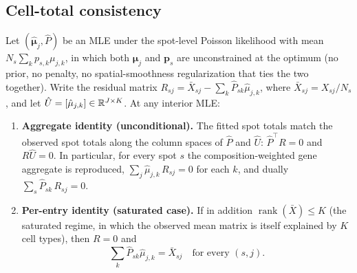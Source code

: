 \subsection{Cell-total consistency}

\begin{theorem}
\label{thm:cell-total-st}
Let $(\hat{\bm{\mu}}_j, \hat{P})$ be an MLE under the spot-level
Poisson likelihood with mean $N_s \sum_k p_{s,k}\mu_{j,k}$, in which
both $\bm{\mu}_j$ and $\bm{p}_s$ are unconstrained at the optimum
(no prior, no penalty, no spatial-smoothness regularization that
ties the two together). Write the residual matrix
$R_{sj} = \bar{X}_{sj} - \sum_k \hat P_{sk}\hat\mu_{j,k}$, where
$\bar{X}_{sj} = X_{sj}/N_s$, and let $\hat U = [\hat\mu_{j,k}] \in
\mathbb{R}^{J \times K}$. At any interior MLE:
\begin{enumerate}
\item[\emph{(a)}] \textbf{Aggregate identity (unconditional).} The
  fitted spot totals match the observed spot totals along the column
  spaces of $\hat P$ and $\hat U$: $\hat P^\top R = 0$ and
  $R\hat U = 0$. In particular, for every spot $s$ the
  composition-weighted gene aggregate is reproduced,
  $\sum_j \hat\mu_{j,k}\,R_{sj} = 0$ for each $k$, and dually
  $\sum_s \hat P_{sk}\,R_{sj} = 0$.
\item[\emph{(b)}] \textbf{Per-entry identity (saturated case).} If in
  addition $\operatorname{rank}(\bar X) \le K$ (the saturated regime,
  in which the observed mean matrix is itself explained by $K$ cell
  types), then $R = 0$ and
  \begin{equation}
    \sum_k \hat{P}_{sk} \hat{\mu}_{j,k} = \bar{X}_{sj}
    \quad\text{for every } (s,j).
    \label{eq:cell-total-st}
  \end{equation}
\end{enumerate}
\end{theorem}


